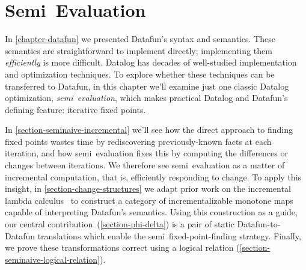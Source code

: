 \chapter{Semi\naive\ Evaluation}
\label{chapter-seminaive}


\noindent
In \cref{chapter-datafun} we presented Datafun's syntax and semantics. These semantics are straightforward to implement directly; implementing them \emph{efficiently} is more difficult. Datalog has decades of well-studied implementation and optimization techniques.
%
To explore whether these techniques can be transferred to Datafun, in this
chapter we'll examine just one classic Datalog optimization,
\emph{semi\naive\ evaluation}, which makes practical Datalog and Datafun's
defining feature: iterative fixed points.

In \cref{section-seminaive-incremental} we'll see how the direct approach to finding fixed points wastes time by rediscovering previously-known facts at each iteration, and how semi\naive\ evaluation fixes this by computing the differences or changes between iterations.
%
We therefore see semi\naive\ evaluation as a matter of incremental computation, that is, efficiently responding to change.
%
To apply this insight, in \cref{section-change-structures} we adapt prior work on the incremental lambda calculus~\citep{incremental} to construct a category of incrementalizable monotone maps capable of interpreting Datafun's semantics.
%
Using this construction as a guide, our central contribution~(\cref{section-phi-delta}) is a pair of static Datafun-to-Datafun translations which enable the semi\naive\ fixed-point-finding strategy. Finally, we prove these transformations correct using a logical relation  (\cref{section-seminaive-logical-relation}).








